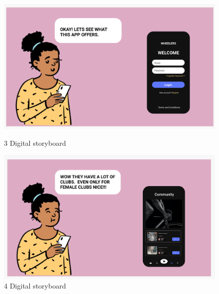\documentclass{l4proj}
\begin{document}
\begin{figure}
 \centering
 \begin{minipage}[b]{0.55\textwidth}
  \includegraphics[width=1\textwidth]{images/3.png}
  \caption{3 Digital storyboard}
 \end{minipage}%
 \begin{minipage}[b]{0.55\textwidth}
  \includegraphics[width=1\textwidth]{images/4.png}
  \caption{4 Digital storyboard}
 \end{minipage}
\end{figure}
\end{document}
